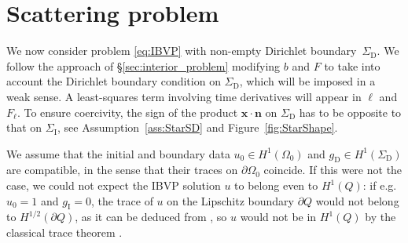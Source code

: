 \documentclass[a4paper]{article}
\theoremstyle{plain}
\theoremstyle{definition}
\newcommand{\vect}[1]{\bm{#1}}
\newcommand{\SD}{{\Sigma_{\mathrm D}}}
\newcommand{\SI}{{\Sigma_{\mathrm I}}}
\newcommand{\gD}{{g_{\mathrm D}}}
\newcommand{\gI}{{g_{\mathrm I}}}
\newcommand{\vx}{{\vect x}}
\newcommand{\vn}{{\vect n}}
\newcommand{\OZ}{{\Omega_0}}
\begin{document}
\section{Scattering problem}\label{sec:Scattering}
We now consider problem \eqref{eq:IBVP} with non-empty Dirichlet boundary~$\SD$.
We follow the approach of \S\ref{sec:interior_problem} modifying $b$ and $F$ to take into account the Dirichlet boundary condition on $\SD$, which will be imposed in a weak sense. A least-squares term involving time derivatives will appear in $\ell$ and $F_\ell$.
To ensure coercivity, the sign of the product $\vx\cdot\vn$ on $\SD$ has to be opposite to that on $\SI$, see Assumption~\ref{ass:StarSD} and Figure~\ref{fig:StarShape}.

We assume that the initial and boundary data $u_0\in H^1(\OZ)$ and $\gD\in H^1(\SD)$ are compatible, in the sense that their traces on $\partial\OZ$ coincide.
If this were not the case, we could not expect the IBVP solution $u$ to belong even to $H^1(Q)$: if e.g.\ $u_0=1$ and $\gI=0$, the trace of $u$ on the Lipschitz boundary $\partial Q$ would not belong to $H^{1/2}(\partial Q)$, as it can be deduced from \cite[sect.~5.2]{Triebel2002}, so $u$ would not be in $H^1(Q)$ by the classical trace theorem \cite[Thm.~3.37]{McLean00}.
\end{document}
